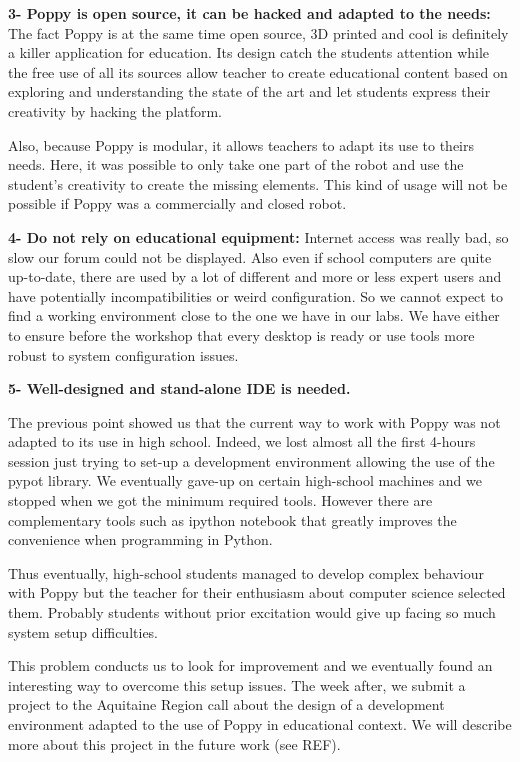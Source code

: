 \textbf{3- Poppy is open source, it can be hacked and adapted to the needs:}
The fact Poppy is at the same time open source, 3D printed and cool is definitely a killer application for education. Its design catch the students attention while the free use of all its sources allow teacher to create educational content based on exploring and understanding the state of the art and let students express their creativity by hacking the platform.


Also, because Poppy is modular, it allows teachers to adapt its use to theirs needs. Here, it was possible to only take one part of the robot and use the student’s creativity to create the missing elements. This kind of usage will not be possible if Poppy was a commercially and closed robot.

\textbf{4- Do not rely on educational equipment:}
Internet access was really bad, so slow our forum could not be displayed. Also even if school computers are quite up-to-date, there are used by a lot of different and more or less expert users and have potentially incompatibilities or weird configuration. So we cannot expect to find a working environment close to the one we have in our labs.
We have either to ensure before the workshop that every desktop is ready or use tools more robust to system configuration issues.

\textbf{5- Well-designed and stand-alone IDE is needed.}

The previous point showed us that the current way to work with Poppy was not adapted to its use in high school. Indeed, we lost almost all the first 4-hours session just trying to set-up a development environment allowing the use of the pypot library. We eventually gave-up on certain high-school machines and we stopped when we got the minimum required tools. However there are complementary tools such as ipython notebook that greatly improves the convenience when programming in Python.

Thus eventually, high-school students managed to develop complex behaviour with Poppy but the teacher for their enthusiasm about computer science selected them. Probably students without prior excitation would give up facing so much system setup difficulties.

This problem conducts us to look for improvement and we eventually found an interesting way to overcome this setup issues. The week after, we submit a project to the Aquitaine Region call about the design of a development environment adapted to the use of Poppy in educational context. We will describe more about this project in the future work (see REF).


